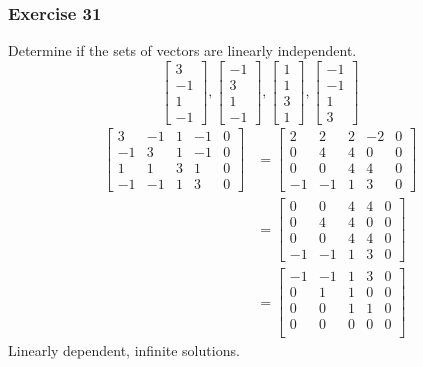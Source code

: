 \documentclass[letterpaper, 12pt]{math}
\begin{document}
\subsubsection*{Exercise 31}
Determine if the sets of vectors are linearly independent.
\[ \begin{bmatrix}3 \\ -1 \\ 1 \\ -1\end{bmatrix},
  \begin{bmatrix}-1 \\ 3 \\ 1 \\ -1\end{bmatrix},
  \begin{bmatrix}1 \\ 1 \\ 3 \\ 1\end{bmatrix},
  \begin{bmatrix}-1 \\ -1 \\ 1 \\ 3\end{bmatrix} \]
\begin{align*}
  \begin{bmatrix}
    3 & -1 & 1 & -1 & 0 \\
    -1 & 3 & 1 & -1 & 0 \\
    1 & 1 & 3 & 1 & 0 \\
    -1 & -1 & 1 & 3 & 0
  \end{bmatrix} &= \begin{bmatrix}
    2 & 2 & 2 & -2 & 0 \\
    0 & 4 & 4 & 0 & 0 \\
    0 & 0 & 4 & 4 & 0 \\
    -1 & -1 & 1 & 3 & 0
  \end{bmatrix} \\
  &= \begin{bmatrix}
    0 & 0 & 4 & 4 & 0 \\
    0 & 4 & 4 & 0 & 0 \\
    0 & 0 & 4 & 4 & 0 \\
    -1 & -1 & 1 & 3 & 0
  \end{bmatrix} \\
  &= \begin{bmatrix}
    -1 & -1 & 1 & 3 & 0 \\
    0 & 1 & 1 & 0 & 0 \\
    0 & 0 & 1 & 1 & 0 \\
    0 & 0 & 0 & 0 & 0 \\
  \end{bmatrix}
\end{align*}
Linearly dependent, infinite solutions.
\end{document}
